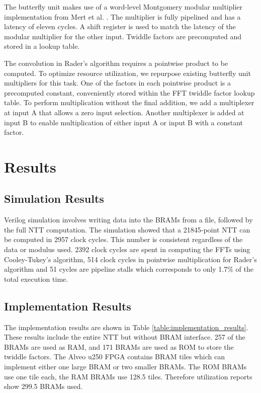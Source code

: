 \documentclass[lettersize,journal]{IEEEtran}
\begin{document}
The butterfly unit makes use of a word-level Montgomery modular multiplier implementation from Mert et al. \cite{9171507}. The multiplier is fully pipelined and has a latency of eleven cycles. A shift register is used to match the latency of the modular multiplier for the other input. Twiddle factors are precomputed and stored in a lookup table.

The convolution in Rader's algorithm requires a pointwise product to be computed. To optimize resource utilization, we repurpose existing butterfly unit multipliers for this task. One of the factors in each pointwise product is a precomputed constant, conveniently stored within the FFT twiddle factor lookup table. To perform multiplication without the final addition, we add a multiplexer at input A that allows a zero input selection. Another multiplexer is added at input B to enable multiplication of either input A or input B with a constant factor.

\section{Results}

\subsection{Simulation Results}

Verilog simulation involves writing data into the BRAMs from a file, followed by the full NTT computation. The simulation showed that a 21845-point NTT can be computed in 2957 clock cycles. This number is consistent regardless of the data or modulus used. 2392 clock cycles are spent in computing the FFTs using Cooley-Tukey's algorithm, 514 clock cycles in pointwise multiplication for Rader's algorithm and 51 cycles are pipeline stalls which corresponds to only 1.7\% of the total execution time.

\subsection{Implementation Results}

The implementation results are shown in Table \ref{table:implementation_results}. These results include the entire NTT but without BRAM interface. 257 of the BRAMs are used as RAM, and 171 BRAMs are used as ROM to store the twiddle factors. The Alveo u250 FPGA contains BRAM tiles which can implement either one large BRAM or two smaller BRAMs. The ROM BRAMs use one tile each, the RAM BRAMs use 128.5 tiles. Therefore utilization reports show 299.5 BRAMs used.
\end{document}
